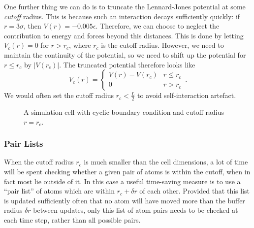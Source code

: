 \documentclass{article}
\theoremstyle{plain}\theoremheaderfont{\normalfont\itshape}\theorembodyfont{\rmfamily}\theoremseparator{.}\newtheorem*{rem}{Remark}\newtheorem*{ex}{Example}\newtheorem*{proof}{Proof}\newtheorem*{altp}{Alternative proof}
\theoremstyle{plain}\theoremheaderfont{\normalfont\bfseries}\theorembodyfont{\rmfamily}\theoremseparator{.}\newtheorem{thm}{Theorem}[section]\newtheorem{lem}[thm]{Lemma}\newtheorem{prop}[thm]{Proposition}\newtheorem*{cor}{Corollary}\newtheorem{defn}[thm]{Definition}\newtheorem{clm}[thm]{Claim}\newtheorem{clminproof}{Claim}\newtheorem{alg}[thm]{Algorithm}\newtheorem{hyp}[thm]{Hypothesis}\newtheorem{law}[thm]{Law}
\theoremstyle{break}\theoremheaderfont{\normalfont\itshape}\theorembodyfont{\rmfamily}\theoremseparator{.\medskip}\newtheorem*{proofskip}{Proof}\newtheorem*{exs}{Examples}\newtheorem*{rems}{Remarks}
\theoremstyle{break}\theoremheaderfont{\normalfont\bfseries}\theorembodyfont{\rmfamily}\theoremseparator{.\medskip}\newtheorem{lemskip}[thm]{Lemma}\newtheorem{defnskip}[thm]{Definition}\newtheorem{propskip}[thm]{Proposition}\newtheorem{thmskip}[thm]{Theorem}
\numberwithin{equation}{section}
\newcommand{\abs}[1]{\left| #1 \right|}
\begin{document}
    One further thing we can do is to truncate the Lennard-Jones potential at some \textit{cutoff} radius. This is because such an interaction decays sufficiently quickly: if \(r=3\sigma\), then \(V(r)=-0.005\epsilon\). Therefore, we can choose to neglect the contribution to energy and forces beyond this distances. This is done by letting \(V_c(r)=0\) for \(r>r_c\), where \(r_c\) is the cutoff radius. However, we need to maintain the continuity of the potential, so we need to shift up the potential for \(r\le r_c\) by \(\abs{V(r_c)}\). The truncated potential therefore looks like
    \begin{equation}
        V_c(r)=\begin{cases}
            V(r)-V(r_c) & r\le r_c \\
            0 & r>r_c
        \end{cases}\,.
    \end{equation}
    We would often set the cutoff radius \(r_c<\frac{L}{2}\) to avoid self-interaction artefact.

    \begin{figure}
        \centering
        \caption{A simulation cell with cyclic boundary condition and cutoff radius \(r=r_c\).}
    \end{figure}

    \subsubsection{Pair Lists}
    When the cutoff radius \(r_c\) is much smaller than the cell dimensions, a lot of time will be spent checking whether a given pair of atoms is within the cutoff, when in fact most lie outside of it. In this case a useful time-saving measure is to use a ``pair list'' of atoms which are within \(r_c+\delta r\) of each other. Provided that this list is updated sufficiently often that no atom will have moved more than the buffer radius \(\delta r\) between updates, only this list of atom pairs needs to be checked at each time step, rather than all possible pairs.
\end{document}
